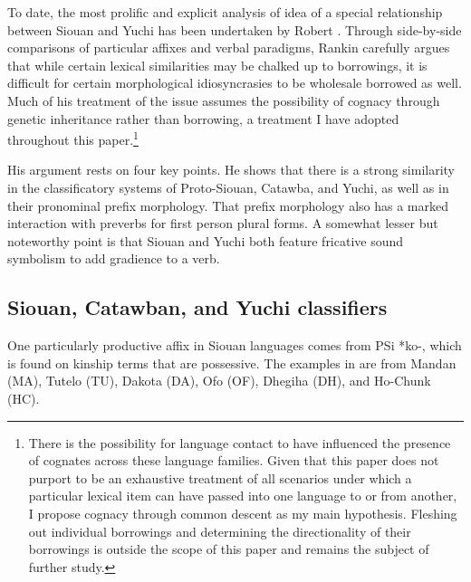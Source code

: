 \documentclass[output=paper]{LSP/langsci}
\begin{document}
To date, the most prolific and explicit analysis of  idea of a special relationship between Siouan and Yuchi has been undertaken by Robert \citet{Rankin1996,Rankin1998scy}. Through side-by-side comparisons of particular affixes and verbal paradigms, Rankin carefully argues that while certain lexical similarities may be chalked up to borrowings, it is difficult for certain morphological idiosyncrasies to be wholesale borrowed as well. Much of his treatment of the issue assumes the possibility of cognacy through genetic inheritance rather than borrowing, a treatment I have adopted throughout this paper.\footnote{There is the possibility for language contact to have influenced the presence of cognates across these language families. Given that this paper does not purport to be an exhaustive treatment of all scenarios under which a particular lexical item can have passed into one language to or from another, I propose cognacy through common descent as my main hypothesis. Fleshing out individual borrowings and determining the directionality of their borrowings is outside the scope of this paper and remains the subject of further study.}

His argument rests on four key points. He shows that there is a strong similarity in the classificatory systems of Proto-Siouan, Catawba, and Yuchi, as well as in their pronominal prefix morphology. That prefix morphology also has a marked interaction with preverbs for first person plural forms. A somewhat lesser but noteworthy point is that Siouan and Yuchi both feature fricative sound symbolism to add gradience to a verb.

\subsection{Siouan, Catawban, and Yuchi classifiers}

One particularly productive affix in Siouan languages comes from PSi *ko-, which is found on kinship terms that are possessive. The examples in  are from Mandan (MA), Tutelo (TU), Dakota (DA), Ofo (OF), Dhegiha (DH), and Ho-Chunk (HC).

\begin{table} 
\end{table}
\end{document}
